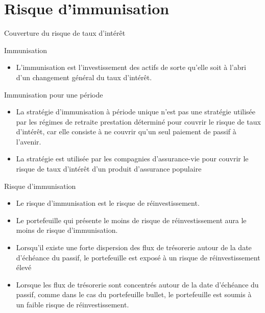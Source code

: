 \documentclass[10pt,a4paper]{beamer}
\begin{document}
\section{Risque d'immunisation}
\begin{frame}{Couverture du risque de taux d’intérêt}
\begin{block}{Immunisation}
\begin{itemize}[label=\bullet]
\item L'immunisation est l'investissement des actifs de sorte qu'elle soit à l'abri d'un changement général du taux d'intérêt.
\end{itemize}
\end{block}
\begin{block}{Immunisation pour une période}
\begin{itemize}[label=\bullet]
\item La stratégie d'immunisation à période unique n'est pas une stratégie utilisée par les régimes de retraite prestation déterminé  pour couvrir le risque de taux d'intérêt, car elle consiste à ne couvrir qu'un seul paiement de passif à l'avenir.
\item La stratégie est utilisée par les compagnies d'assurance-vie pour couvrir le risque de taux d'intérêt d'un produit d'assurance populaire
\end{itemize}
\end{block}
\end{frame}
\begin{frame}{Risque d'immunisation}
\begin{itemize}[label=\bullet]
\item Le risque d'immunisation est le risque de réinvestissement.
\item Le portefeuille qui présente le moins de risque de réinvestissement aura le moins de risque d'immunisation.
\item Lorsqu'il existe une forte dispersion des flux de trésorerie autour de la date d'échéance du passif, le portefeuille est exposé à un risque de réinvestissement élevé
\item Lorsque les flux de trésorerie sont concentrés autour de la date d'échéance du passif, comme dans le cas du portefeuille bullet, le portefeuille est soumis à un faible risque de réinvestissement.
\end{itemize}
\end{frame}
\end{document}
